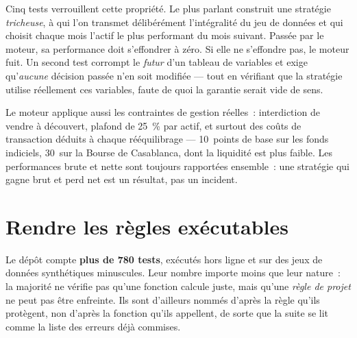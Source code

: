 Cinq tests verrouillent cette propriété. Le plus parlant construit une stratégie
\emph{tricheuse}, à qui l'on transmet délibérément l'intégralité du jeu de données
et qui choisit chaque mois l'actif le plus performant du mois suivant. Passée par
le moteur, sa performance doit s'effondrer à zéro. Si elle ne s'effondre pas, le
moteur fuit. Un second test corrompt le \emph{futur} d'un tableau de variables et
exige qu'\emph{aucune} décision passée n'en soit modifiée — tout en vérifiant que
la stratégie utilise réellement ces variables, faute de quoi la garantie serait
vide de sens.

\begin{remarquebox}
Le moteur applique aussi les contraintes de gestion réelles~: interdiction de
vendre à découvert, plafond de 25~\% par actif, et surtout des coûts de
transaction déduits à chaque rééquilibrage — 10~points de base sur les fonds
indiciels, 30~sur la Bourse de Casablanca, dont la liquidité est plus faible. Les
performances brute et nette sont toujours rapportées ensemble~: une stratégie qui
gagne brut et perd net est un résultat, pas un incident.
\end{remarquebox}

\section{Rendre les règles exécutables}

Le dépôt compte \textbf{plus de 780 tests}, exécutés hors ligne
et sur des jeux de données synthétiques minuscules. Leur nombre importe moins que
leur nature~: la majorité ne vérifie pas qu'une fonction calcule juste, mais
qu'une \emph{règle de projet} ne peut pas être enfreinte. Ils sont d'ailleurs
nommés d'après la règle qu'ils protègent, non d'après la fonction qu'ils
appellent, de sorte que la suite se lit comme la liste des erreurs déjà commises.

